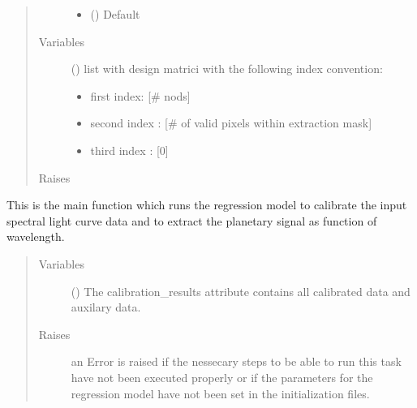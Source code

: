 \documentclass[a4paper,10pt,english]{sphinxmanual}
\begin{document}
\begin{fulllineitems}
\begin{fulllineitems}
\begin{quote}
\begin{description}
\begin{itemize}
\item {} 
 () \textendash{} Default 

\end{itemize}

\item[{Variables}] \leavevmode
{} () \textendash{} 
list with design matrici with the following index convention:
\begin{itemize}
\item {} 
first index: {[}\# nods{]}

\item {} 
second index : {[}\# of valid pixels within extraction mask{]}

\item {} 
third index : {[}0{]}

\end{itemize}


\item[{Raises}] \leavevmode
{}

\end{description}\end{quote}

\end{fulllineitems}


\begin{fulllineitems}
\label{\detokenize{cascade.TSO:cascade.TSO.TSO.TSOSuite.calibrate_timeseries}}
This is the main function which runs the regression model to
calibrate the input spectral light curve data and to extract the
planetary signal as function of wavelength.
\begin{quote}\begin{description}
\item[{Variables}] \leavevmode
{} () \textendash{} The calibration\_results attribute contains all calibrated data
and auxilary data.

\item[{Raises}] \leavevmode
{} \textendash{} an Error is raised if the nessecary steps to be able to run this
task have not been executed properly or if the parameters for
the regression model have not been set in the initialization files.


\end{description}
\end{quote}
\end{fulllineitems}
\end{fulllineitems}
\end{document}
